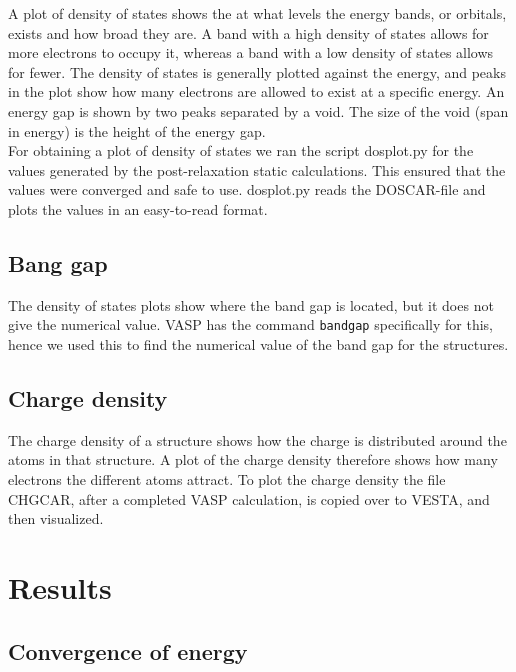\documentclass{article}
\begin{document}
    A plot of density of states shows the at what levels the energy bands, or orbitals, exists and how broad they are. A band with a high density of states allows for more electrons to occupy it, whereas a band with a low density of states allows for fewer. The density of states is generally plotted against the energy, and peaks in the plot show how many electrons are allowed to exist at a specific energy. An energy gap is shown by two peaks separated by a void. The size of the void (span in energy) is the height of the energy gap. \\

    For obtaining a plot of density of states we ran the script dosplot.py for the values generated by the post-relaxation static calculations. This ensured that the values were converged and safe to use. dosplot.py reads the DOSCAR-file and plots the values in an easy-to-read format. \\


  \subsection{Bang gap}

    The density of states plots show where the band gap is located, but it does not give the numerical value. VASP has the command \texttt{bandgap} specifically for this, hence we used this to find the numerical value of the band gap for the structures. \\


  \subsection{Charge density}

    The charge density of a structure shows how the charge is distributed around the atoms in that structure. A plot of the charge density therefore shows how many electrons the different atoms attract. To plot the charge density the file CHGCAR, after a completed VASP calculation, is copied over to VESTA, and then visualized.


\vspace{1cm}

\section{Results}   \label{sec:Results}

  \subsection{Convergence of energy}
\end{document}
